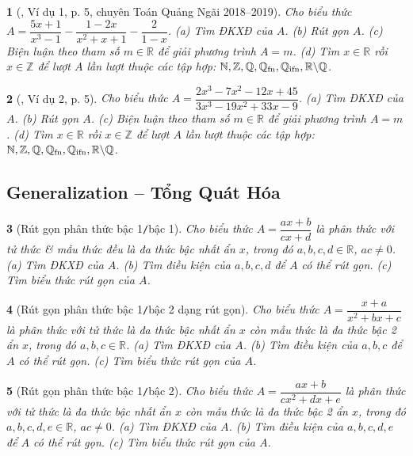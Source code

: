 \documentclass{article}
\newtheorem{baitoan}{}
\begin{document}
\begin{baitoan}[\cite{Lam_An_Tuan_Toan_9_dai_so}, Ví dụ 1, p. 5, chuyên Toán Quảng Ngãi 2018--2019]
	Cho biểu thức $A = \dfrac{5x + 1}{x^3 - 1} - \dfrac{1 - 2x}{x^2 + x + 1} - \dfrac{2}{1 - x}$. (a) Tìm {\rm ĐKXĐ} của $A$. (b) Rút gọn $A$. (c) Biện luận theo tham số $m\in\mathbb{R}$ để giải phương trình $A = m$. (d) Tìm $x\in\mathbb{R}$ rồi $x\in\mathbb{Z}$ để lượt $A$ lần lượt thuộc các tập hợp:  $\mathbb{N},\mathbb{Z},\mathbb{Q},\mathbb{Q}_{\rm fn},\mathbb{Q}_{\rm ifn},\mathbb{R}\backslash\mathbb{Q}$.
\end{baitoan}

\begin{baitoan}[\cite{Lam_An_Tuan_Toan_9_dai_so}, Ví dụ 2, p. 5]
	Cho biểu thức $A = \dfrac{2x^3 - 7x^2 - 12x + 45}{3x^3 -19x^2 + 33x - 9}$. (a) Tìm {\rm ĐKXĐ} của $A$. (b) Rút gọn $A$. (c) Biện luận theo tham số $m\in\mathbb{R}$ để giải phương trình $A = m$. (d) Tìm $x\in\mathbb{R}$ rồi $x\in\mathbb{Z}$ để lượt $A$ lần lượt thuộc các tập hợp:  $\mathbb{N},\mathbb{Z},\mathbb{Q},\mathbb{Q}_{\rm fn},\mathbb{Q}_{\rm ifn},\mathbb{R}\backslash\mathbb{Q}$.
\end{baitoan}


\subsection{Generalization -- Tổng Quát Hóa}

\begin{baitoan}[Rút gọn phân thức bậc 1{\tt/}bậc 1]
	Cho biểu thức $A = \dfrac{ax + b}{cx + d}$ là phân thức với tử thức \& mẫu thức đều là đa thức bậc nhất ẩn $x$, trong đó $a,b,c,d\in\mathbb{R}$, $ac\ne0$. (a) Tìm {\rm ĐKXĐ} của $A$. (b) Tìm điều kiện của $a,b,c,d$ để $A$ có thể rút gọn. (c) Tìm  biểu thức rút gọn của $A$.
\end{baitoan}

\begin{baitoan}[Rút gọn phân thức bậc 1{\tt/}bậc 2 dạng rút gọn]
	Cho biểu thức $A = \dfrac{x + a}{x^2 + bx + c}$ là phân thức với tử thức là đa thức bậc nhất ẩn $x$ còn mẫu thức là đa thức bậc 2 ẩn $x$, trong đó $a,b,c\in\mathbb{R}$. (a) Tìm {\rm ĐKXĐ} của $A$. (b) Tìm điều kiện của $a,b,c$ để $A$ có thể rút gọn. (c) Tìm biểu thức rút gọn của $A$.
\end{baitoan}

\begin{baitoan}[Rút gọn phân thức bậc 1{\tt/}bậc 2]
	Cho biểu thức $A = \dfrac{ax + b}{cx^2 + dx + e}$ là phân thức với tử thức là đa thức bậc nhất ẩn $x$ còn mẫu thức là đa thức bậc 2 ẩn $x$, trong đó $a,b,c,d,e\in\mathbb{R}$, $ac\ne0$. (a) Tìm {\rm ĐKXĐ} của $A$. (b) Tìm điều kiện của $a,b,c,d,e$ để $A$ có thể rút gọn. (c) Tìm biểu thức rút gọn của $A$.
\end{baitoan}
\end{document}
